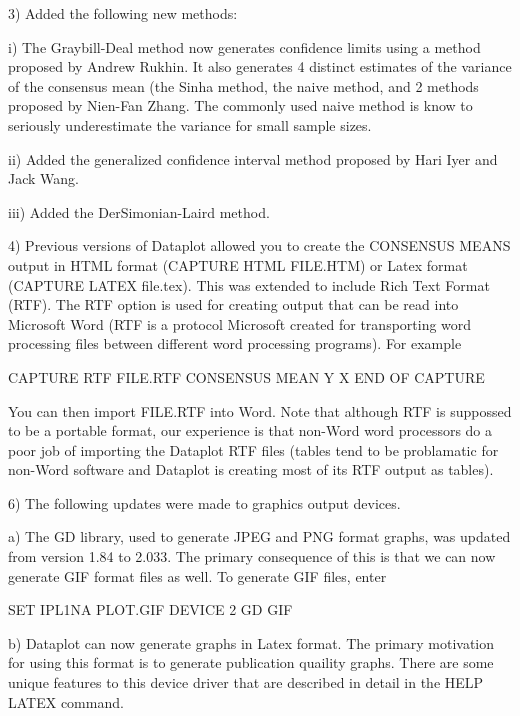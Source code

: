{        3) Added the following new methods:

             i) The Graybill-Deal method now generates confidence
                limits using a method proposed by Andrew Rukhin.
                It also generates 4 distinct estimates of the
                variance of the consensus mean (the Sinha method,
                the naive method, and 2 methods proposed by
                Nien-Fan Zhang.  The commonly used naive method
                is know to seriously underestimate the variance
                for small sample sizes.

            ii) Added the generalized confidence interval method
                proposed by Hari Iyer and Jack Wang.

           iii) Added the DerSimonian-Laird method.

        4) Previous versions of Dataplot allowed you to create
           the CONSENSUS MEANS output in HTML format
           (CAPTURE HTML FILE.HTM) or Latex format
           (CAPTURE LATEX file.tex).  This was extended to
           include Rich Text Format (RTF).  The RTF option
           is used for creating output that can be read into
           Microsoft Word (RTF is a protocol Microsoft created
           for transporting word processing files between
           different word processing programs).  For example

               CAPTURE RTF FILE.RTF
               CONSENSUS MEAN Y X
               END OF CAPTURE

           You can then import FILE.RTF into Word.  Note that
           although RTF is suppossed to be a portable format,
           our experience is that non-Word word processors do a
           poor job of importing the Dataplot RTF files (tables
           tend to be problamatic for non-Word software and
           Dataplot is creating most of its RTF output as tables).

 6) The following updates were made to graphics output devices.

    a) The GD library, used to generate JPEG and PNG format
       graphs, was updated from version 1.84 to 2.033.  The
       primary consequence of this is that we can now generate
       GIF format files as well.  To generate GIF files, enter

          SET IPL1NA  PLOT.GIF
          DEVICE 2 GD GIF

    b) Dataplot can now generate graphs in Latex format.
       The primary motivation for using this format is
       to generate publication quaility graphs.  There are
       some unique features to this device driver that are
       described in detail in the HELP LATEX command.

}
